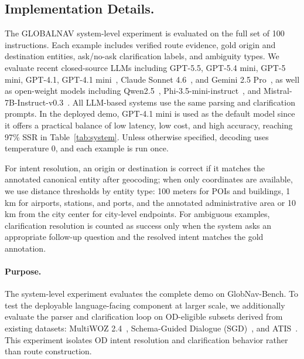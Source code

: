 \documentclass[11pt]{article}
\newcommand{\sys}{GLOBALNAV\xspace}
\newcommand{\bench}{GlobNav-Bench\xspace}
\begin{document}
\subsection{Implementation Details.}
The \sys system-level experiment is evaluated on the full set of 100 instructions. Each example includes verified route evidence, gold origin and destination entities, ask/no-ask clarification labels, and ambiguity types. We evaluate recent closed-source LLMs including GPT-5.5, GPT-5.4 mini, GPT-5 mini, GPT-4.1, GPT-4.1 mini~\citep{openai_models_2026}, Claude Sonnet 4.6~\citep{anthropic_sonnet46_2026}, and Gemini 2.5 Pro~\citep{google_gemini_models_2026}, as well as open-weight models including Qwen2.5~\citep{yang2024qwen25technicalreport}, Phi-3.5-mini-instruct~\citep{abdin2024phi-}, and Mistral-7B-Instruct-v0.3~\citep{jiang2023mistral7b}. All LLM-based systems use the same parsing and clarification prompts. In the deployed demo, GPT-4.1 mini is used as the default model since it offers a practical balance of low latency, low cost, and high accuracy, reaching 97\% SSR in Table~\ref{tab:system}. Unless otherwise specified, decoding uses temperature 0, and each example is run once.

For intent resolution, an origin or destination is correct if it matches the annotated canonical entity after geocoding; when only coordinates are available, we use distance thresholds by entity type: 100 meters for POIs and buildings, 1 km for airports, stations, and ports, and the annotated administrative area or 10 km from the city center for city-level endpoints. For ambiguous examples, clarification resolution is counted as success only when the system asks an appropriate follow-up question and the resolved intent matches the gold annotation.

\paragraph{Purpose.}
The system-level experiment evaluates the complete demo on \bench. To test the deployable language-facing component at larger scale, we additionally evaluate the parser and clarification loop on OD-eligible subsets derived from existing datasets: MultiWOZ 2.4~\citep{ye-etal-2022-multiwoz}, Schema-Guided Dialogue (SGD)~\citep{rastogi-etal-2020-schema}, and ATIS~\citep{hemphill-etal-1990-atis}. This experiment isolates OD intent resolution and clarification behavior rather than route construction.
\end{document}
